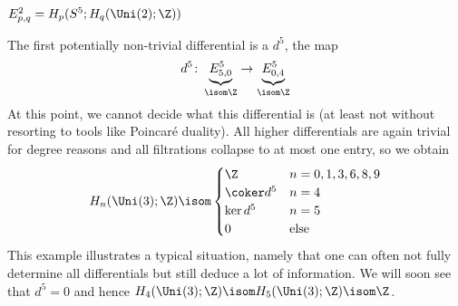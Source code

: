 \begin{example}
\begin{center}
 \\
		$E^2_{p, q} = H_p(S^5; H_q(\Uni(2); \Z))$
	\end{center}
	The first potentially non-trivial differential is a $d^5$, the map
	\begin{equation*}
		d^5\colon \underbrace{E^5_{5, 0}}_{\isom \Z} \to \underbrace{E^5_{0, 4}}_{\isom \Z}
	\end{equation*}
	At this point, we cannot decide what this differential is (at least not without resorting to tools like Poincaré duality).
	All higher differentials are again trivial for degree reasons and all filtrations collapse to at most one entry, so we obtain
	\begin{equation*}
		H_n(\Uni(3); \Z) \isom \begin{cases}
			\Z 			& n = 0, 1, 3, 6, 8, 9 \\
			\coker d^5 	& n = 4 \\
			\ker d^5 	& n = 5 \\
			0 			& \text{else}
		\end{cases}
	\end{equation*}
	This example illustrates a typical situation, namely that one can often not fully determine all differentials but still deduce a lot of information.
	We will soon see that $d^5 = 0$ and hence $H_4(\Uni(3); \Z) \isom H_5(\Uni(3); \Z) \isom \Z$.
\end{example}
